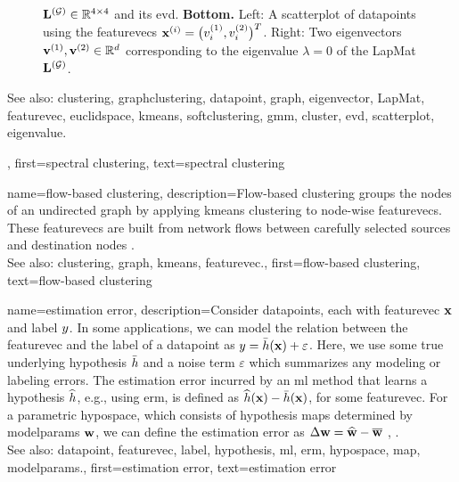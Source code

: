 {{\begin{figure}[H]
\begin{center}
{					${\bf L}^{(\mathcal{G})}  \in \mathbb{R}^{4 \times 4}$ and its \gls{evd}. 
					{\bf Bottom.} Left: A \gls{scatterplot} of \glspl{datapoint} using the \glspl{featurevec} 
					${\bf x}^{(i)} = \big( v^{(1)}_{i},v^{(2)}_{i} \big)^{T}$. 
					Right: Two \glspl{eigenvector} ${\bf v}^{(1)},{\bf v}^{(2)} \in \mathbb{R}^{d}$ 
					corresponding to the \gls{eigenvalue} $\lambda=0$ of the \gls{LapMat} ${\bf L}^{(\mathcal{G})}$. 
					} 
			\end{center}
		\end{figure}
		See also: \gls{clustering}, \gls{graphclustering}, \gls{datapoint}, \gls{graph}, \gls{eigenvector}, \gls{LapMat}, \gls{featurevec}, \gls{euclidspace}, \gls{kmeans}, \gls{softclustering}, \gls{gmm}, \gls{cluster}, \gls{evd}, \gls{scatterplot}, \gls{eigenvalue}.
	\newpage}, 
	first={spectral clustering},
	text={spectral clustering} 
}

{name={flow-based clustering},
	description={Flow-based \gls{clustering} groups the nodes 
		of an undirected \gls{graph} by applying \gls{kmeans} \gls{clustering} to node-wise 
		\glspl{featurevec}. These \glspl{featurevec} are built from network flows between 
		carefully selected sources and destination nodes \cite{FlowSpecClustering2021}. 
					\\ 
		See also: \gls{clustering}, \gls{graph}, \gls{kmeans}, \gls{featurevec}.}, 
	first={flow-based clustering},
	text={flow-based clustering} 
}



{name={estimation error},
	description={Consider \glspl{datapoint}, each with \gls{featurevec} ${\bf x}$ and \gls{label} 
		$y$. In some applications, we can model the relation between the \gls{featurevec} and the \gls{label}
		of a \gls{datapoint} as $y = \bar{h}({\bf x}) + \varepsilon$. Here, we 
		use some true underlying \gls{hypothesis} $\bar{h}$ and a noise term $\varepsilon$ 
		which summarizes any modeling or labeling errors. The estimation error incurred by an \gls{ml} 
		method that learns a \gls{hypothesis} $\widehat{h}$, e.g., using \gls{erm}, is defined as 
		$\widehat{h}({\bf x}) - \bar{h}({\bf x})$, for some \gls{featurevec}. 
		For a parametric \gls{hypospace}, which consists of \gls{hypothesis} \glspl{map} determined by 
		\gls{modelparams} ${\bf w}$, we can define the estimation error as $\Delta {\bf w} = \widehat{{\bf w}} - \overline{{\bf w}}$ \cite{hastie01statisticallearning}, \cite{kay}.
					\\ 
		See also: \gls{datapoint}, \gls{featurevec}, \gls{label}, \gls{hypothesis}, \gls{ml}, \gls{erm}, \gls{hypospace}, \gls{map}, \gls{modelparams}.},
	first={estimation error},
	text={estimation error} 
}


